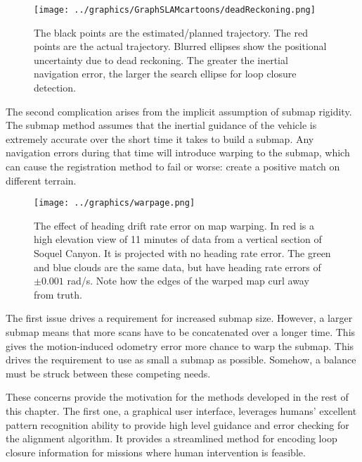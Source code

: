  \begin{figure}[htbp]
   \centering
   \texttt{[image: ../graphics/GraphSLAMcartoons/deadReckoning.png]} %
   \caption{The black points are the estimated/planned trajectory. The red points are the actual trajectory. Blurred ellipses show the positional uncertainty due to dead reckoning. The greater the inertial navigation error, the larger the search ellipse for loop closure detection.  }
   \label{fig:BathyMapping3}
\end{figure}


The second complication arises from the implicit assumption of submap rigidity. The submap method assumes that the inertial guidance of the vehicle is extremely accurate over the short time it takes to build a submap. Any navigation errors during that time will introduce warping to the submap, which can cause the registration method to fail or worse: create a positive match on different terrain. 

 \begin{figure}[htbp]
   \centering
   \texttt{[image: ../graphics/warpage.png]} %
   \caption{The effect of heading drift rate error on map warping. In red is a high elevation view of 11 minutes of data from a vertical section of Soquel Canyon. It is projected with no heading rate error. The green and blue clouds are the same data, but have heading rate errors of $\pm0.001$ rad/s. Note how the edges of the warped map curl away from truth.}
   \label{fig:motionErrorWarping}
\end{figure}

The first issue drives a requirement for increased submap size. However, a larger submap means that more scans have to be concatenated over a longer time. This gives the motion-induced odometry error more chance to warp the submap. This drives the requirement to use as small a submap as possible. Somehow, a balance must be struck between these competing needs. 


These concerns provide the motivation for the methods developed in the rest of this chapter. The first one, a graphical user interface, leverages humans' excellent pattern recognition ability to provide high level guidance and error checking for the alignment algorithm. It provides a streamlined method for encoding loop closure information for missions where human intervention is feasible. 

